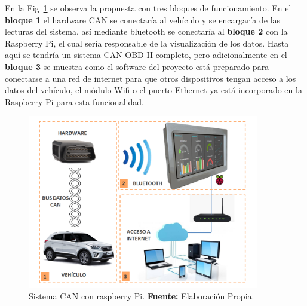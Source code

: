 En la Fig~\ref{fig_raspberri_c4} se observa la propuesta con tres bloques de funcionamiento. 
En el \textbf{bloque 1} el hardware CAN se conectaría al vehículo y se encargaría de las lecturas del sistema, así mediante bluetooth se conectaría al \textbf{bloque 2} con la Raspberry Pi, el cual sería responsable de la visualización de los datos. 
Hasta aquí se tendría un sistema CAN OBD II completo, pero adicionalmente en el \textbf{bloque 3} se muestra como el software del proyecto está preparado para conectarse a una red de internet para que otros dispositivos tengan acceso a los datos del vehículo, el módulo Wifi o el puerto Ethernet ya está incorporado en la Raspberry Pi para esta funcionalidad. 

\begin{figure}[H]
	\centering
		\includegraphics[width=0.9\textwidth]{./Cap00imagen/fig_raspberri_f.png}
	\caption[Sistema CAN con raspberry Pi.]{Sistema CAN con raspberry Pi.\textbf{ Fuente:}  Elaboración Propia.}
	\label{fig_raspberri_c4} %
\end{figure}


